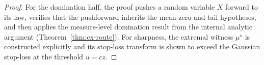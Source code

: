 \begin{proof}\leanok
For the domination half, the proof pushes a random variable $X$ forward to its
law, verifies that the pushforward inherits the mean-zero and tail hypotheses,
and then applies the measure-level domination result from the internal
analytic argument (Theorem~\ref{thm:cx-route}).
For sharpness, the extremal witness $\mu^\star$ is constructed explicitly and
its stop-loss transform is shown to exceed the Gaussian stop-loss at the
threshold $u = cz$.
\end{proof}
